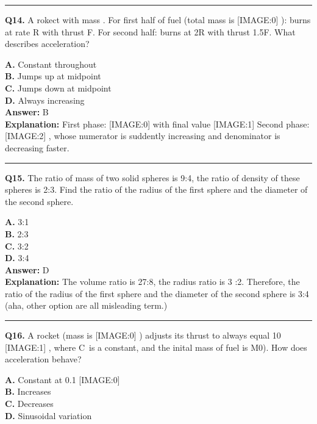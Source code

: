 \documentclass[12pt]{article}
\begin{document}
\hrule
\vspace{1em}


\noindent
\textbf{Q14.} A rokect with mass
. For first half of fuel (total mass is
[IMAGE:0]
): burns at rate R with thrust F. For second half: burns at 2R with thrust 1.5F.
What describes acceleration?



\textbf{A.} Constant throughout \\
\textbf{B.} Jumps up at midpoint \\
\textbf{C.} Jumps down at midpoint \\
\textbf{D.} Always increasing \\

\textbf{Answer:} B \\
\textbf{Explanation:} First phase:
[IMAGE:0]
with final value
[IMAGE:1]
Second phase:
[IMAGE:2]
, whose numerator is suddently increasing and denominator is decreasing faster.

\hrule
\vspace{1em}


\noindent
\textbf{Q15.} The ratio of mass of two solid spheres is 9:4, the ratio of density of these spheres is 2:3. Find the ratio of the radius of the first sphere and the diameter of the second sphere.



\textbf{A.} 3:1 \\
\textbf{B.} 2:3 \\
\textbf{C.} 3:2 \\
\textbf{D.} 3:4 \\

\textbf{Answer:} D \\
\textbf{Explanation:} The volume ratio is 27:8, the radius ratio is 3 :2. Therefore, the ratio of the radius of the first sphere and the diameter of the second sphere is 3:4 (aha, other option are all misleading term.)

\hrule
\vspace{1em}


\noindent
\textbf{Q16.} A rocket (mass is
[IMAGE:0]
) adjusts its thrust to always equal 10%
[IMAGE:1]
, where C is a constant, and the inital mass of fuel is M0).
How does acceleration behave?



\textbf{A.} Constant at 0.1
[IMAGE:0] \\
\textbf{B.} Increases \\
\textbf{C.} Decreases \\
\textbf{D.} Sinusoidal variation \\
\end{document}
